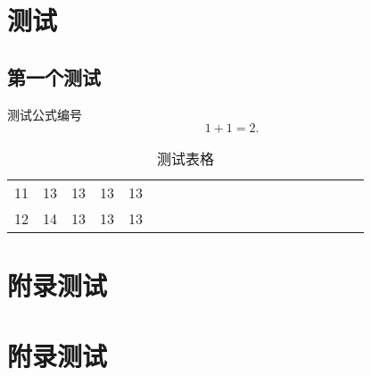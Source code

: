 \documentclass[]{csuthesis}
\begin{document}
\chapter{测试}

\section{第一个测试}
测试公式编号
\begin{equation}
  1+1=2.
\end{equation}


\begin{table}[h]
  \centering
  \caption{测试表格}
  \begin{tabular}{*{20}c}
    \hline
    11 & 13 & 13 & 13 & 13 \\
    12 & 14 & 13 & 13 & 13 \\
    \hline
  \end{tabular}
\end{table}


\chapter{附录测试}


\chapter{附录测试}


\cleardoublepage
\end{document}
